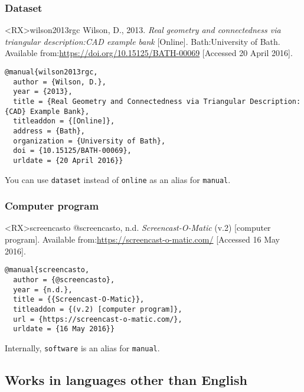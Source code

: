 \documentclass[10pt,a4paper]{article}
\newenvironment{info}{%
  \begin{list}{\makebox[2em][c]{\faInfoCircle}}{%
    \setlength{\leftmargin}{2em}
    \setlength{\labelwidth}{2em}
    \setlength{\labelsep}{0pt}}
}{\end{list}}
\begin{document}
\subsubsection*{Dataset}

\begin{bibexbox}<RX>{wilson2013rgc}
  Wilson, D., 2013. \emph{Real geometry and connectedness via triangular description:\@ CAD example bank} [Online]. Bath:\@ University of Bath. Available from:\@ \url{https://doi.org/10.15125/BATH-00069} [Accessed 20 April 2016].
  \tcblower
\begin{Verbatim}
@manual{wilson2013rgc,
  author = {Wilson, D.},
  year = {2013},
  title = {Real Geometry and Connectedness via Triangular Description: {CAD} Example Bank},
  titleaddon = {[Online]},
  address = {Bath},
  organization = {University of Bath},
  doi = {10.15125/BATH-00069},
  urldate = {20 April 2016}}
\end{Verbatim}
\end{bibexbox}

\begin{info}\item You can use \texttt{dataset} instead of \texttt{online} as an alias for \texttt{manual}.\end{info}

\subsubsection*{Computer program}

\begin{bibexbox}<RX>{screencasto}
  @screencasto, n.d. \emph{Screencast-O-Matic} (v.2) [computer program]. Available from:\@ \url{https://screencast-o-matic.com/} [Accessed 16 May 2016].
  \tcblower
\begin{Verbatim}
@manual{screencasto,
  author = {@screencasto},
  year = {n.d.},
  title = {{Screencast-O-Matic}},
  titleaddon = {(v.2) [computer program]},
  url = {https://screencast-o-matic.com/},
  urldate = {16 May 2016}}
\end{Verbatim}
\end{bibexbox}

\begin{info}\item Internally, \texttt{software} is an alias for \texttt{manual}.\end{info}

\subsection{Works in languages other than English}
\end{document}
